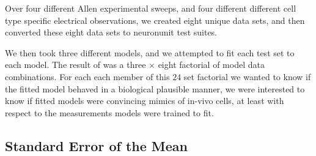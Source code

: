 Over four different Allen experimental sweeps, and four different different cell type specific electrical observations, we created eight unique data sets, and then converted these eight data sets to neuronunit test suites.

We then took three different models, and we attempted to fit each test set to each model. The result of was a three $\times $ eight factorial of model data combinations. For each each member of this $24$ set factorial we wanted to know if the fitted model behaved in a biological plausible manner, we were interested to know if fitted models were convincing mimics of in-vivo cells, at least with respect to the measurements models were trained to fit.

\subsection{Standard Error of the Mean}
\begin{table}
\caption[Standard Error of the mean across NeuroElectro Data Sources]{A table of SEM values that describe dispersal in many of the different measurements I used to fit the optimized models to (NeuroElectro only).}
\end{table}

